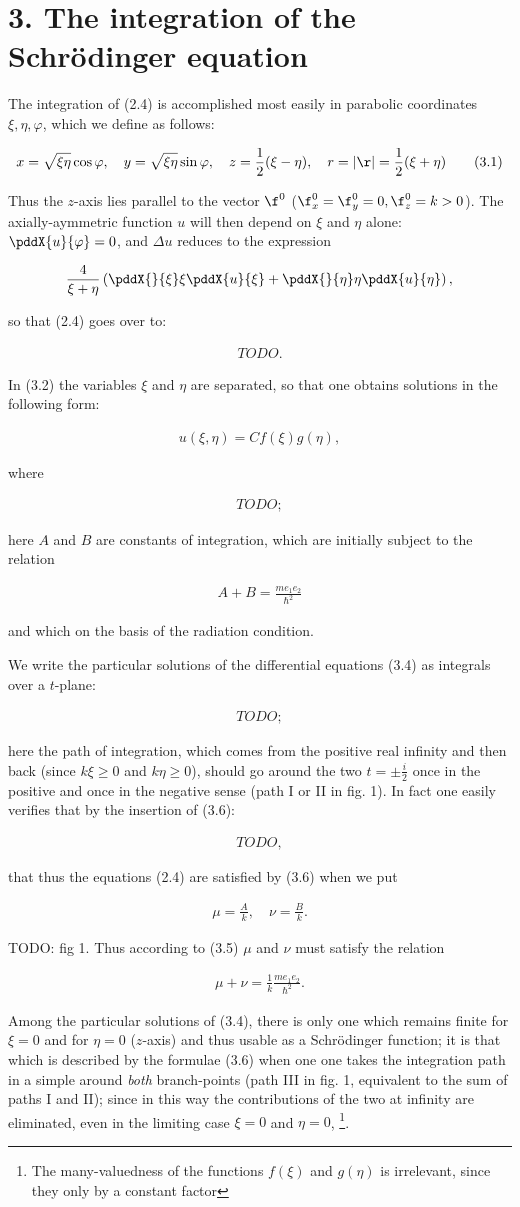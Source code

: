\documentclass{report}
\newcommand{\nequ}[2]{
\begin{align*}
#1
\tag{#2}
\end{align*}
}
\newcommand{\uequ}[1]{
\begin{align*}
#1
\end{align*}
}
\begin{document}
\section*{3. The integration of the Schr\"odinger equation}
The integration of (2.4) is accomplished most easily in parabolic coordinates $\xi, \eta, \varphi$, which we define as follows:
\nequ{
x = \sqrt{\xi\eta}\cos{\varphi},\quad
y = \sqrt{\xi\eta}\sin{\varphi},\quad
z = \frac{1}{2}(\xi - \eta), \quad
r = |\r| = \frac{1}{2}(\xi + \eta)
}{3.1}
Thus the $z$-axis lies parallel to the vector $\f^0$ ($\f^0_x = \f^0_y = 0, \f^0_z = k > 0$). The axially-aymmetric function $u$ will then depend on $\xi$ and $\eta$ alone: $\pddX{u}{\varphi}=0$, and $\Delta u$ reduces to the expression
\uequ{
\frac{4}{\xi+\eta}\left(
\pddX{}{\xi} \xi \pddX{u}{\xi} + \pddX{}{\eta}\eta\pddX{u}{\eta}
\right),
}
so that (2.4) goes over to:
\nequ{
TODO.
}{3.2}
In (3.2) the variables $\xi$ and $\eta$ are separated, so that one obtains solutions in the following form:
\nequ{
u(\xi,\eta) = C f(\xi) g(\eta),
}{3.3}
where
\nequ{
TODO;
}{3.4}
here $A$ and $B$ are constants of integration, which are initially subject to the relation
\nequ{
A+B=\frac{m e_1 e_2}{\hbar^2}
}{3.5}
and which  on the basis of the radiation condition.

We write the particular solutions of the differential equations (3.4) as integrals over a $t$-plane:
\nequ{
TODO;
}{3.6}
here the path of integration, which comes from the positive real infinity and then back (since $k\xi \ge 0$ and $k\eta \ge 0$), should go around the two  $t=\pm \frac{i}{2}$ once in the positive and once in the negative sense (path I or II in fig. 1). In fact one easily verifies that by the insertion of (3.6):
\uequ{
TODO,
}
that thus the equations (2.4) are satisfied by (3.6) when we put
\uequ{
\mu = \frac{A}{k},\quad \nu = \frac{B}{k}.
}
TODO: fig 1.
Thus according to (3.5) $\mu$ and $\nu$ must satisfy the relation
\nequ{
\mu+\nu = \frac{1}{k}\frac{m e_1 e_2}{\hbar^2}.
}{3.7}

Among the particular solutions of (3.4), there is only one which remains finite for $\xi=0$ and for $\eta=0$ ($z$-axis) and thus usable as a Schr\"odinger function; it is that which is described by the formulae (3.6) when one one takes the integration path in a simple  around \textit{both} branch-points (path III in fig. 1, equivalent to the sum of paths I and II); since in this way the contributions of the two  at infinity are eliminated, even in the limiting case $\xi=0$ and $\eta=0$, \footnote{The many-valuedness of the functions $f(\xi)$ and $g(\eta)$ is irrelevant, since they only  by a constant factor}.
\end{document}
